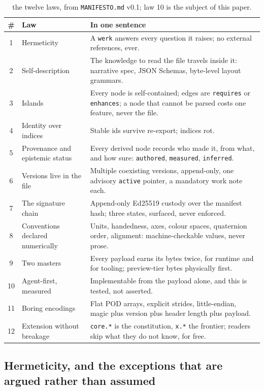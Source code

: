 \documentclass[10pt,twocolumn,letterpaper]{article}
\newcommand{\code}[1]{\texttt{\small #1}}
\begin{document}
\begin{table}[t]\centering\footnotesize
\caption{the twelve laws, from \code{MANIFESTO.md} v0.1; law 10 is the subject of this paper.}
\begin{tabular}{@{}c L{2.05cm} L{4.2cm}@{}}
\toprule
\# & Law & In one sentence \\
 & Hermeticity & A \code{werk} answers every question it raises; no external references, ever. \\
2 & Self-description & The knowledge to read the file travels inside it: narrative spec, JSON Schemas, byte-level layout grammars. \\
3 & Islands & Every node is self-contained; edges are \code{requires} or \code{enhances}; a node that cannot be parsed costs one feature, never the file. \\
4 & Identity over indices & Stable ids survive re-export; indices rot. \\
5 & Provenance and epistemic status & Every derived node records who made it, from what, and how sure: \code{authored}, \code{measured}, \code{inferred}. \\
6 & Versions live in the file & Multiple coexisting versions, append-only, one advisory \code{active} pointer, a mandatory work note each. \\
7 & The signature chain & Append-only Ed25519 custody over the manifest hash; three states, surfaced, never enforced. \\
8 & Conventions declared numerically & Units, handedness, axes, colour spaces, quaternion order, alignment: machine-checkable values, never prose. \\
9 & Two masters & Every payload earns its bytes twice, for runtime and for tooling; preview-tier bytes physically first. \\
10 & Agent-first, measured & Implementable from the payload alone, and this is tested, not asserted. \\
11 & Boring encodings & Flat POD arrays, explicit strides, little-endian, magic plus version plus header length plus payload. \\
12 & Extension without breakage & \code{core.*} is the constitution, \code{x.*} the frontier; readers skip what they do not know, for free. \\
\bottomrule
\end{tabular}
\end{table}

\subsection{Hermeticity, and the exceptions that are argued rather than assumed}
\end{document}

